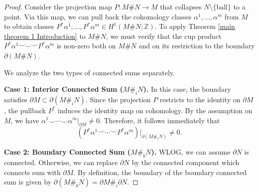 \documentclass[11pt,letterpaper]{amsart}
\theoremstyle{definition}
\theoremstyle{remark}
\numberwithin{equation}{section}
\begin{document}
\begin{proof}
    Consider the projection map $P: M \# N \to M$ that collapses $N \setminus \{\text{ball}\}$ to a point.  Via this map, we can pull back the cohomology classes $\alpha^1, \dots, \alpha^m$ from $M$ to obtain classes $P^*\alpha^1, \dots, P^*\alpha^m \in H^1(M \# N; \mathbb{Z})$. To apply Theorem \ref{main theorem 1 Introduction} to $M \# N$, we must verify that the cup product $P^*\alpha^1 \smile \cdots \smile P^*\alpha^m$ is non-zero both on $M \# N$ and on its restriction to the boundary $\partial(M \# N)$.

    We analyze the two types of connected sums separately.

    \textbf{Case 1: Interior Connected Sum ($M \#_i N$).}
    In this case, the boundary satisfies $\partial M\subset \partial(M \#_i N)$. Since the projection $P$ restricts to the identity on $\partial M$, the pullback $P^*$ induces the identity map on cohomology. By the assumption on $M$, we have $\alpha^1 \smile \cdots \smile \alpha^m|_{\partial M} \neq 0$. Therefore, it follows immediately that
    \[
    (P^*\alpha^1 \smile \cdots \smile P^*\alpha^m)|_{\partial(M \#_i N)} \neq 0.
    \]

    \textbf{Case 2: Boundary Connected Sum ($M \#_b N$).}
    WLOG, we can assume $\partial N$ is connected. Otherwise, we can replace $\partial N$ by the connected component which connects sum with $\partial M$. By definition, the boundary of the boundary connected sum is given by $\partial(M \#_b N) = \partial M \#_i \partial N$. 


\end{proof}
\end{document}
